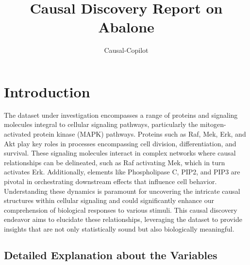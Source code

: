 \documentclass{article}
\title{Causal Discovery Report on Abalone}
\author{Causal-Copilot}
\begin{document}
\maketitle

\section{Introduction}
The dataset under investigation encompasses a range of proteins and signaling molecules integral to cellular signaling pathways, particularly the mitogen-activated protein kinase (MAPK) pathways. Proteins such as Raf, Mek, Erk, and Akt play key roles in processes encompassing cell division, differentiation, and survival. These signaling molecules interact in complex networks where causal relationships can be delineated, such as Raf activating Mek, which in turn activates Erk. Additionally, elements like Phospholipase C, PIP2, and PIP3 are pivotal in orchestrating downstream effects that influence cell behavior. Understanding these dynamics is paramount for uncovering the intricate causal structures within cellular signaling and could significantly enhance our comprehension of biological responses to various stimuli. This causal discovery endeavor aims to elucidate these relationships, leveraging the dataset to provide insights that are not only statistically sound but also biologically meaningful.

\subsection{Detailed Explanation about the Variables}
\end{document}

